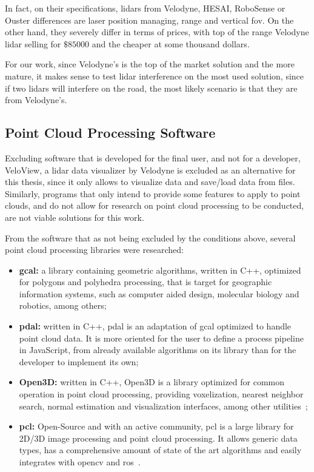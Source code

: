 In fact, on their specifications, \acp{lidar} from Velodyne, HESAI, RoboSense or Ouster differences are laser position managing, range and vertical \ac{fov}. On the other hand, they severely differ in terms of prices, with top of the range Velodyne \ac{lidar} selling for $\$85000$ and the cheaper at some thousand dollars. 

For our work, since Velodyne's is the top of the market solution and the more mature, it makes sense to test \ac{lidar} interference on the most used solution, since if two \acp{lidar} will interfere on the road, the most likely scenario is that they are from Velodyne's.

\subsection{Point Cloud Processing Software}
Excluding software that is developed for the final user, and not for a developer, VeloView\texttrademark, a \ac{lidar} data visualizer by Velodyne is excluded as an alternative for this thesis, since it only allows to visualize data and save/load data from files. Similarly, programs that only intend to provide some features to apply to point clouds, and do not allow for research on point cloud processing to be conducted, are not viable solutions for this work. 

From the software that as not being excluded by the conditions above, several point cloud processing libraries were researched: 

\begin{itemize}
	\item \textbf{\ac{gcal}:}	a library containing geometric algorithms, written in C++, optimized for polygons and polyhedra processing, that is target for geographic information systems, such as computer aided design, molecular biology and robotics, among others\cite{GDAL};
	\item \textbf{\ac{pdal}:} written in C++, \ac{pdal} is an adaptation of \ac{gcal} optimized to handle point cloud data. It is more oriented for the user to define a process pipeline in JavaScript, from already available algorithms on its library than for the developer to implement its own\cite{PDAL};
	\item \textbf{Open3D:} written in C++, Open3D is a library optimized for common operation in point cloud processing, providing voxelization, nearest neighbor search, normal estimation and visualization interfaces, among other utilities~\cite{Open3D};
	\item \textbf{\acf{pcl}:} Open-Source and with an active community, \ac{pcl} is a large library for 2D/3D image processing and point cloud processing. It allows generic data types, has a comprehensive amount of state of the art algorithms and easily integrates with \ac{opencv} and \ac{ros}~\cite{PCL}.
\end{itemize}


